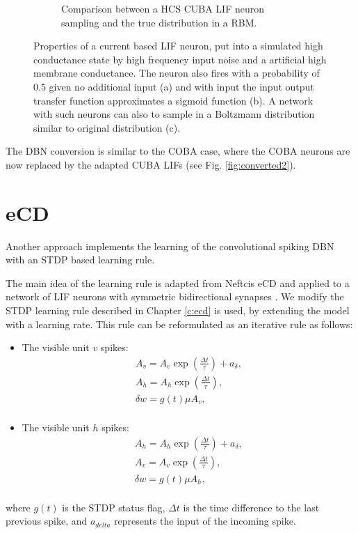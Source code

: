 \begin{figure}
\begin{subfigure}[t]{.5\textwidth}
  		\caption{Comparison between a HCS CUBA LIF neuron sampling and the true distribution in a RBM.}
  		\label{fig:sub2}
	\end{subfigure}
	\caption{Properties of a current based LIF neuron, put into a simulated high conductance state by high frequency input noise and a artificial high membrane conductance. The neuron also fires with a probability of $0.5$ given no additional input (a) and with input the input output transfer function approximates a sigmoid function (b). A network with such neurons can also to sample in a Boltzmann distribution similar to original distribution (c).}
	\label{fig:cubahcs}
\end{figure}
The DBN conversion is similar to the COBA case, where the COBA neurons are now replaced by the adapted CUBA LIFs (see Fig. \ref{fig:converted2}).

\section{eCD} \label{c:ecdappr}

Another approach implements the learning of the convolutional spiking DBN with an STDP based learning rule. 

The main idea of the learning rule is adapted from Neftcis eCD and applied to a network of LIF neurons with symmetric bidirectional synapses \cite{Neftci2013}.
We modify the STDP learning rule described in Chapter \ref{c:ecd} is used, by extending the model with a learning rate. 
This rule can be reformulated as an iterative rule as follows:
\begin{itemize}
\item The visible unit $v$ spikes: 
\[
\begin{split}
A_v = A_v \exp(\frac{\Delta t}{\tau}) + a_{\delta} ,\\
A_h = A_h \exp(\frac{\Delta t}{\tau}) ,\\
\delta w = g(t) \mu A_v  ,\\
\end{split}
\]
\item The visible unit $h$ spikes: 
\[
\begin{split}
A_h = A_h \exp(\frac{\Delta t}{\tau}) + a_{\delta} ,\\
A_v = A_v \exp(\frac{\Delta t}{\tau}) ,\\
\delta w = g(t) \mu A_h  ,\\
\end{split}
\]
\end{itemize}
where $g(t)$ is the STDP status flag, $\Delta t$ is the time difference to the last previous spike, and $a_{delta}$ represents the input of the incoming spike.


